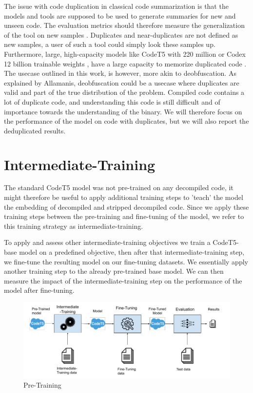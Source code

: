 The issue with code duplication in classical code summarization is that the models and tools are supposed to be used to generate summaries for new and unseen code. The evaluation metrics should therefore measure the generalization of the tool on new samples \cite{allamanis_adverse}. Duplicates and near-duplicates are not defined as new samples, a user of such a tool could simply look these samples up. Furthermore, large, high-capacity models like CodeT5 with 220 million or Codex 12 billion \cite{CodeX} trainable weights \cite{CodeT5}, have a large capacity to memorize duplicated code \cite{allamanis_adverse}.
The usecase outlined in this work, is however, more akin to deobfuscation. As explained by Allamanis, deobfuscation could be a usecase where duplicates are valid and part of the true distribution of the problem\cite{allamanis_adverse}. Compiled code contains a lot of duplicate code, and understanding this code is still difficult and of importance towards the understanding of the binary. We will therefore focus on the performance of the model on code with duplicates, but we will also report the deduplicated results.

\section{Intermediate-Training}
The standard CodeT5 model was not pre-trained on any decompiled code, it might therefore be useful to apply additional training steps to 'teach' the model the embedding of decompiled and stripped decompiled code. Since we apply these training steps between the pre-training and fine-tuning of the model, we refer to this training strategy as intermediate-training.

To apply and assess other intermediate-training objectives we train a CodeT5-base model on a predefined objective, then after that intermediate-training step, we fine-tune the resulting model on our fine-tuning datasets. We essentially apply another training step to the already pre-trained base model. We can then measure the impact of the intermediate-training step on the performance of the model after fine-tuning.

\label{fig:preTraining}
\begin{figure}[H]
  \centering
  \includegraphics[width=\linewidth]{img/pre-training.png}
  \caption{Pre-Training}
\end{figure}

